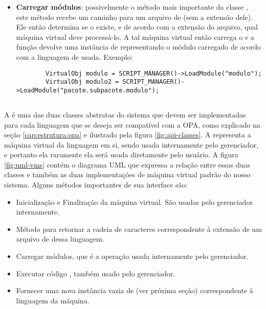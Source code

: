 \begin{itemize}
    \item \textbf{Carregar módulos}: possivelmente o método mais importante da classe \SMgr{}, este
      método recebe um caminho para um arquivo de \script{} (sem a extensão dele). Ele então determina
      se o \script{} existe, e de acordo com a extensão do arquivo, qual máquina virtual deve processá-lo.
      A tal máquina virtual então carrega o \script{} e a função devolve uma instância de \VObj{}
      representando o módulo carregado de acordo com a linguagem de \script{} usada. Exemplo:
      \vspace{1em}
      \begin{lstlisting}
        VirtualObj modulo = SCRIPT_MANAGER()->LoadModule("modulo");
        VirtualObj modulo2 = SCRIPT_MANAGER()->LoadModule("pacote.subpacote.modulo");
      \end{lstlisting}

  \end{itemize}

  \subsection{\VMac{}}
  \label{sec:atividades:opa:vmac}
  A \VMac{} é uma das duas classes abstratas do sistema que devem ser implementadas para
  cada linguagem que se deseja ser compatível com a OPA, como explicado na seção
  \ref{cap:estrutura:opa} e ilustrado pela figura \ref{fig:api-classes}.
  A \VMac{} representa a máquina virtual da linguagem em si, sendo usada internamente pelo 
  gerenciador, e portanto ela raramente ela será usada diretamente pelo usuário. A figura
  \ref{fig:uml-vms} contém o diagrama UML que expressa a relação entre essas duas classes
  e também as duas implementações de máquina virtual padrão do nosso sistema. Alguns
  métodos importantes de sua interface são:
  
  \begin{itemize}
    \item Inicialização e Finalização da máquina virtual. São usadas pelo gerenciador internamente.
    \item Método para retornar a cadeia de caracteres correspondente à extensão de um 
      arquivo de \script{} dessa linguagem.
    \item Carregar módulos, que é a operação usada internamente pelo gerenciador.
    \item Executar código \script{}, também usado pelo gerenciador.
    \item Fornecer uma nova instância vazia de \VData{} (ver próxima seção) correspondente à
      linguagem da máquina.
  \end{itemize}

